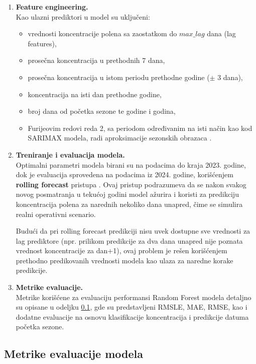 \documentclass[12pt]{article}
\begin{document}
\begin{enumerate}
    \item \textbf{Feature engineering.} \\
    Kao ulazni prediktori u model su uključeni:
    \begin{itemize}
        \item vrednosti koncentracije polena sa zaostatkom do $max\_lag$ dana (lag features),
        \item prosečna koncentracija u prethodnih 7 dana,
        \item prosečna koncentracija u istom periodu prethodne godine ($\pm$ 3 dana),
        \item koncentracija na isti dan prethodne godine,
        \item broj dana od početka sezone te godine i godina,
        \item Furijeovim redovi reda 2, sa periodom određivanim na isti način kao kod SARIMAX modela, radi aproksimacije sezonskih obrazaca \cite{yule1927, slutsky1937}.
    \end{itemize}

    \item \textbf{Treniranje i evaluacija modela.} \\
    Optimalni parametri modela birani su na podacima do kraja 2023. godine, dok je evaluacija sprovedena na podacima iz 2024. godine, korišćenjem \textbf{rolling forecast} pristupa \cite{bergmeir2012use}. Ovaj pristup podrazumeva da se nakon svakog novog posmatranja u tekućoj godini model ažurira i koristi za predikciju koncentracija polena za narednih nekoliko dana unapred, čime se simulira realni operativni scenario.

    Budući da pri rolling forecast predikciji nisu uvek dostupne sve vrednosti za lag prediktore (npr. prilikom predikcije za dva dana unapred nije poznata vrednost koncentracije za dan+1), ovaj problem je rešen korišćenjem prethodno predikovanih vrednosti modela kao ulaza za naredne korake predikcije.

    \item \textbf{Metrike evaluacije.} \\
    Metrike korišćene za evaluaciju performansi Random Forest modela detaljno su opisane u odeljku \ref{sec:evaluation_metrics}, gde su predstavljeni RMSLE, MAE, RMSE, kao i dodatne evaluacije na osnovu klasifikacije koncentracija i predikcije datuma početka sezone.
\end{enumerate}

\subsection{Metrike evaluacije modela}
\label{sec:evaluation_metrics}
\end{document}
